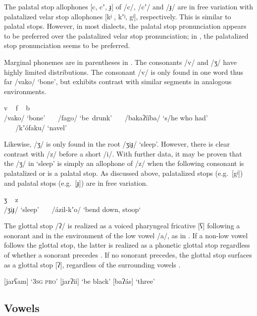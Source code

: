 \documentclass[output=paper]{langsci/langscibook}
\begin{document}
The palatal stop allophones [c, cʼ, ɟ] of /c/, /cʼ/ and /ɟ/ are in free variation with palatalized velar stop allophones [kʲ , kʼʲ, gʲ], respectively. This is similar to  palatal stops. However, in most  dialects, the palatal stop pronunciation appears to be preferred over the palatalized velar stop pronunciation; in , the palatalized stop pronunciation seems to be preferred. 

Marginal phonemes are in parentheses in . The consonants /v/ and /ʒ/ have highly limited distributions. The consonant /v/ is only found in one word thus far /vako/ ‘bone’, but exhibits contrast with similar segments in analogous environments. 

\ea
\glll
v ~ f ~ b ~ \\
/vako/     ‘bone’~~~    /fago/     ‘be~drunk’~~~   /bakaʔííba/  ‘s/he who had’  \\           
~ ~ /kʼ\'{o}faku/   ‘navel’  \\
\z


Likewise, /ʒ/ is only found in the root /ʒiɟ/ ‘sleep’. However, there is clear contrast with /z/ before a short /i/. With further data, it may be proven that the /ʒ/ in ‘sleep’ is simply an allophone of /z/ when the following consonant is palatalized or is a palatal stop. As discussed above, palatalized stops (e.g.\ [gʲ]) and palatal stops (e.g.\ [ɟ]) are in free variation. 

\newpage 

\ea
\gll
ʒ  ~   z  \\
/ʒiɟ/   ‘sleep’~~~    /ázil-kʼo/  ‘bend down, stoop‘\\
\z

The glottal stop /ʔ/ is realized as a voiced pharyngeal fricative [ʕ] following a sonorant and in the environment of the low vowel /a/, as in . If a non-low vowel follows the glottal stop, the latter is realized as a phonetic glottal stop regardless of whether a sonorant precedes . If no sonorant precedes, the glottal stop surfaces as a glottal stop [ʔ], regardless of the surrounding vowels .

\ea\label{ex:ahlandc:3}
\ea\label{ex:ahlandc:3a} [jarʕam] ‘\textsc{3sg pro}' 
\ex\label{ex:ahlandc:3b} [jarʔii] ‘be black’
\ex\label{ex:ahlandc:3c} [baʔás] ‘three’
\z
\z


\subsection{Vowels}\label{sec:ahlandc:3.2}
\end{document}
